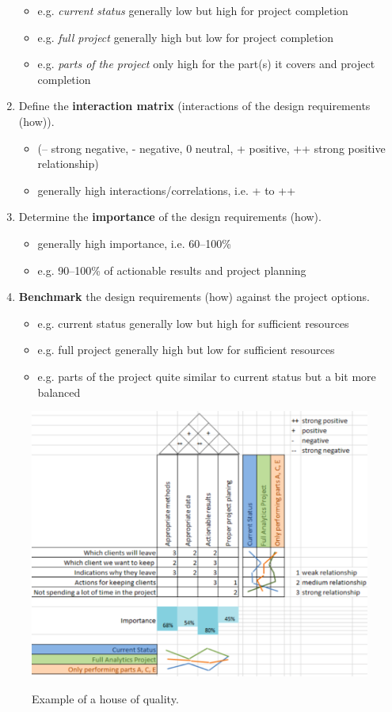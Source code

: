 \documentclass[a4paper, landscape, 6pt, fleqn]{scrartcl}
\renewcommand{\emph}[1]{\textbf{#1}}
\begin{document}
\begin{multicols*}{4}
\begin{enumerate}
\begin{itemize}
\item e.g. \textit{current status} generally low but high for project completion
\item e.g. \textit{full project} generally high but low for project completion
\item e.g. \textit{parts of the project} only high for the part(s) it covers and project completion
\end{itemize}
\item Define the \emph{interaction matrix} (interactions of the design requirements (how)).
\begin{itemize}
\item (-- strong negative, - negative, 0 neutral, + positive, ++ strong positive relationship)
\item generally high interactions/correlations, i.e. + to ++
\end{itemize}
\item Determine the \emph{importance} of the design requirements (how).
\begin{itemize}
\item generally high importance, i.e. 60--100\%
\item e.g. 90--100\% of actionable results and project planning
\end{itemize}
\item \emph{Benchmark} the design requirements (how) against the project options.
\begin{itemize}
\item e.g. current status generally low but high for sufficient resources
\item e.g. full project generally high but low for sufficient resources
\item e.g. parts of the project quite similar to current status but a bit more balanced
\end{itemize}
\end{enumerate}

\begin{figure}[H]
\centering
\includegraphics[width=1.05 \linewidth]{HouseOfQualityExample}
\label{fig:HouseOfQuality}
\caption{Example of a house of quality.}
\end{figure}


\end{multicols*}
\end{document}
